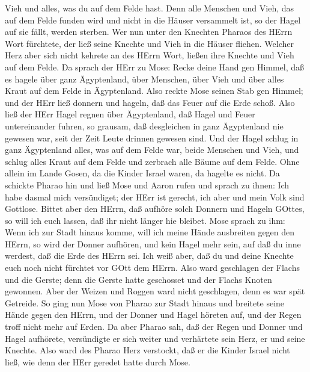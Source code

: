 Vieh und alles, was du auf dem Felde hast. Denn alle Menschen und Vieh,
das auf dem Felde funden wird und nicht in die Häuser versammelt ist, so
der Hagel auf sie fällt, werden sterben.  Wer nun unter den
Knechten Pharaos des HErrn Wort fürchtete, der ließ seine Knechte und
Vieh in die Häuser fliehen.  Welcher Herz aber sich nicht
kehrete an des HErrn Wort, ließen ihre Knechte und Vieh auf dem Felde.
 Da sprach der HErr zu Mose: Recke deine Hand gen Himmel,
daß es hagele über ganz Ägyptenland, über Menschen, über Vieh und über
alles Kraut auf dem Felde in Ägyptenland.  Also reckte Mose
seinen Stab gen Himmel; und der HErr ließ donnern und hageln, daß das
Feuer auf die Erde schoß. Also ließ der HErr Hagel regnen über
Ägyptenland,  daß Hagel und Feuer untereinander fuhren, so
grausam, daß desgleichen in ganz Ägyptenland nie gewesen war, seit der
Zeit Leute drinnen gewesen sind.  Und der Hagel schlug in
ganz Ägyptenland alles, was auf dem Felde war, beide Menschen und Vieh,
und schlug alles Kraut auf dem Felde und zerbrach alle Bäume auf dem
Felde.  Ohne allein im Lande Gosen, da die Kinder Israel
waren, da hagelte es nicht.  Da schickte Pharao hin und
ließ Mose und Aaron rufen und sprach zu ihnen: Ich habe dasmal mich
versündiget; der HErr ist gerecht, ich aber und mein Volk sind Gottlose.
 Bittet aber den HErrn, daß aufhöre solch Donnern und
Hageln GOttes, so will ich euch lassen, daß ihr nicht länger hie
bleibet.  Mose sprach zu ihm: Wenn ich zur Stadt hinaus
komme, will ich meine Hände ausbreiten gegen den HErrn, so wird der
Donner aufhören, und kein Hagel mehr sein, auf daß du inne werdest, daß
die Erde des HErrn sei.  Ich weiß aber, daß du und deine
Knechte euch noch nicht fürchtet vor GOtt dem HErrn.  Also
ward geschlagen der Flachs und die Gerste; denn die Gerste hatte
geschosset und der Flachs Knoten gewonnen.  Aber der Weizen
und Roggen ward nicht geschlagen, denn es war spät Getreide.
 So ging nun Mose von Pharao zur Stadt hinaus und breitete
seine Hände gegen den HErrn, und der Donner und Hagel höreten auf, und
der Regen troff nicht mehr auf Erden.  Da aber Pharao sah,
daß der Regen und Donner und Hagel aufhörete, versündigte er sich weiter
und verhärtete sein Herz, er und seine Knechte.  Also ward
des Pharao Herz verstockt, daß er die Kinder Israel nicht ließ, wie denn
der HErr geredet hatte durch Mose.

